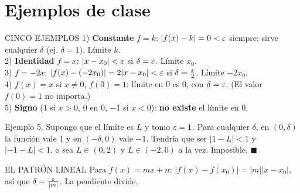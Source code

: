\section{Ejemplos de clase}
\apuntes
\begin{sello}{CINCO EJEMPLOS}
1) \textbf{Constante} $f=k$: $|f(x)-k|=0<\varepsilon$ siempre; sirve cualquier $\delta$ (ej. $\delta=1$). Límite $k$.\\[2pt]
2) \textbf{Identidad} $f=x$: $|x-x_0|<\varepsilon$ si $\delta=\varepsilon$. Límite $x_0$.\\[2pt]
3) $f=-2x$: $|f(x)-(-2x_0)|=2|x-x_0|<\varepsilon$ si $\delta=\frac{\varepsilon}2$. Límite $-2x_0$.\\[2pt]
4) $f(x)=x$ si $x\neq0$, $f(0)=1$: límite en 0 es 0, con $\delta=\varepsilon$. (El valor $f(0)=1$ no importa.)\\[2pt]
5) \textbf{Signo} ($1$ si $x>0$, $0$ en 0, $-1$ si $x<0$): \textbf{no existe} el límite en 0.
\end{sello}
\agregado
\begin{demo}
Ejemplo 5. Supongo que el límite es $L$ y tomo $\varepsilon=1$. Para cualquier $\delta$, en $(0,\delta)$ la función vale 1 y en $(-\delta,0)$ vale $-1$. Tendría que ser $|1-L|<1$ y $|-1-L|<1$, o sea $L\in(0,2)$ y $L\in(-2,0)$ a la vez. Imposible. $\blacksquare$
\end{demo}
\begin{tip}{EL PATRÓN LINEAL}
Para $f(x)=mx+n$: $|f(x)-f(x_0)|=|m||x-x_0|$, así que $\delta=\frac{\varepsilon}{|m|}$. La pendiente divide.
\end{tip}

